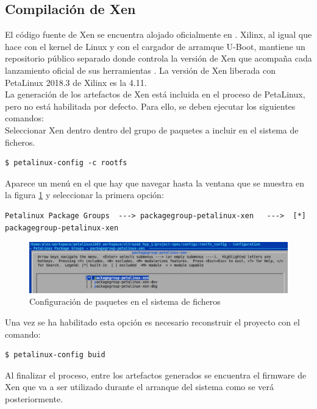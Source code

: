 \subsection{Compilación de Xen}

El código fuente de Xen se encuentra alojado oficialmente en \cite{xen_source}. Xilinx, al igual que hace con el kernel de Linux y con el cargador de arramque U-Boot, mantiene un repositorio público separado donde controla la versión de Xen que acompaña cada lanzamiento oficial de sus herramientas \cite{xen_source_xilinx}. La versión de Xen liberada con PetaLinux 2018.3 de Xilinx es la 4.11.\\
La generación de los artefactos de Xen está incluida en el proceso de PetaLinux, pero no está habilitada por defecto. Para ello, se deben ejecutar los siguientes comandos:\\

Seleccionar Xen dentro dentro del grupo de paquetes a incluir en el sistema de ficheros.
\begin{lstlisting}[style=CStyle]
$ petalinux-config -c rootfs
\end{lstlisting}

Aparece un menú en el que hay que navegar hasta la ventana que se muestra en la figura \ref{fig:xen_menuconfig_1} y seleccionar la primera opción:
\begin{lstlisting}[style=CStyle]
Petalinux Package Groups  ---> packagegroup-petalinux-xen   --->  [*] packagegroup-petalinux-xen
\end{lstlisting}

\begin{figure}[!h]
  \centering
  \includegraphics[width=1.0\textwidth]{recursos/petalinux_xen_1.png}
  \caption{Configuración de paquetes en el sistema de ficheros}
  \label{fig:xen_menuconfig_1}
\end{figure}

Una vez se ha habilitado esta opción es necesario reconstruir el proyecto con el comando:
\begin{lstlisting}[style=CStyle]
$ petalinux-config buid
\end{lstlisting}

Al finalizar el proceso, entre los artefactos generados se encuentra el firmware de Xen que va a ser utilizado durante el arranque del sistema como se verá posteriormente.

